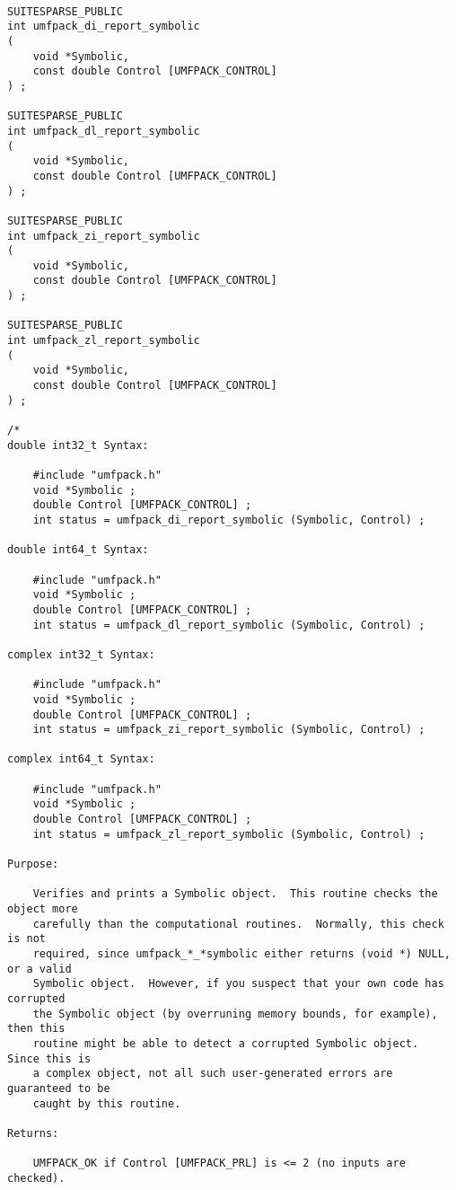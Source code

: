 \documentclass[11pt]{article}
\begin{document}
{\footnotesize
\begin{verbatim}

SUITESPARSE_PUBLIC
int umfpack_di_report_symbolic
(
    void *Symbolic,
    const double Control [UMFPACK_CONTROL]
) ;

SUITESPARSE_PUBLIC
int umfpack_dl_report_symbolic
(
    void *Symbolic,
    const double Control [UMFPACK_CONTROL]
) ;

SUITESPARSE_PUBLIC
int umfpack_zi_report_symbolic
(
    void *Symbolic,
    const double Control [UMFPACK_CONTROL]
) ;

SUITESPARSE_PUBLIC
int umfpack_zl_report_symbolic
(
    void *Symbolic,
    const double Control [UMFPACK_CONTROL]
) ;

/*
double int32_t Syntax:

    #include "umfpack.h"
    void *Symbolic ;
    double Control [UMFPACK_CONTROL] ;
    int status = umfpack_di_report_symbolic (Symbolic, Control) ;

double int64_t Syntax:

    #include "umfpack.h"
    void *Symbolic ;
    double Control [UMFPACK_CONTROL] ;
    int status = umfpack_dl_report_symbolic (Symbolic, Control) ;

complex int32_t Syntax:

    #include "umfpack.h"
    void *Symbolic ;
    double Control [UMFPACK_CONTROL] ;
    int status = umfpack_zi_report_symbolic (Symbolic, Control) ;

complex int64_t Syntax:

    #include "umfpack.h"
    void *Symbolic ;
    double Control [UMFPACK_CONTROL] ;
    int status = umfpack_zl_report_symbolic (Symbolic, Control) ;

Purpose:

    Verifies and prints a Symbolic object.  This routine checks the object more
    carefully than the computational routines.  Normally, this check is not
    required, since umfpack_*_*symbolic either returns (void *) NULL, or a valid
    Symbolic object.  However, if you suspect that your own code has corrupted
    the Symbolic object (by overruning memory bounds, for example), then this
    routine might be able to detect a corrupted Symbolic object.  Since this is
    a complex object, not all such user-generated errors are guaranteed to be
    caught by this routine.

Returns:

    UMFPACK_OK if Control [UMFPACK_PRL] is <= 2 (no inputs are checked).


\end{verbatim}}
\end{document}
